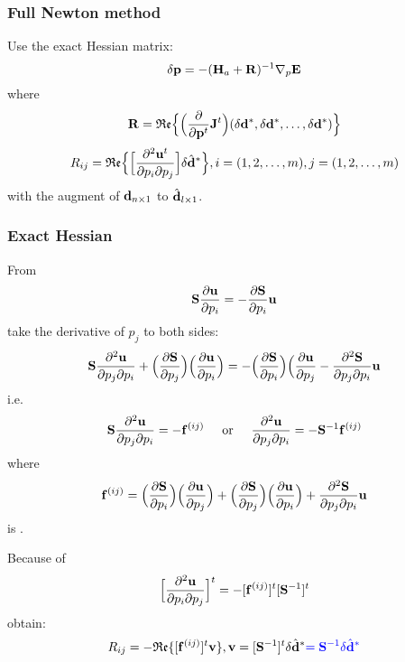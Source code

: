 \subsubsection{Full Newton method}
Use the exact Hessian matrix:
\[ \delta\mathbf{p}=-(\mathbf{H}_a+\mathbf{R})^{-1}\nabla_p\mathbf{E} \]
where
\[ \mathbf{R}=\mathfrak{Re}\Big\{\Big(\frac{\partial}{\partial\mathbf{p}^t}\mathbf{J}^t\Big)(\delta\mathbf{d}^*,\delta\mathbf{d}^*,\ldots,\delta\mathbf{d}^*)\Big\} \]
\[ R_{ij}=\mathfrak{Re}\Big\{\Big[\frac{\partial^2\mathbf{u}^t}{\partial p_i\partial p_j}\Big]\delta\hat{\mathbf{d}}^*\Big\},i=(1,2,\ldots,m),j=(1,2,\ldots,m) \]
with the augment of $\mathbf{d}_{n\times 1}$ to $\hat{\mathbf{d}}_{l\times 1}$.\par
\subsubsection{Exact Hessian}
From
\[ \mathbf{S}\frac{\partial\mathbf{u}}{\partial p_i}=-\frac{\partial\mathbf{S}}{\partial p_i}\mathbf{u} \]
take the derivative of $p_j$ to both sides:
\[ \mathbf{S}\frac{\partial^2\mathbf{u}}{\partial p_j\partial p_i}+\Big(\frac{\partial\mathbf{S}}{\partial p_j}\Big)\Big(\frac{\partial\mathbf{u}}{\partial p_i}\Big)=-\Big(\frac{\partial\mathbf{S}}{\partial p_i}\Big)\Big(\frac{\partial\mathbf{u}}{\partial p_j}-\frac{\partial^2\mathbf{S}}{\partial p_j\partial p_i}\mathbf{u} \]
i.e.
\[ \mathbf{S}\frac{\partial^2\mathbf{u}}{\partial p_j\partial p_i}=-\mathbf{f}^{(ij)} \text{\hspace{5mm}or\hspace{5mm}} \frac{\partial^2\mathbf{u}}{\partial p_j\partial p_i}=-\mathbf{S}^{-1}\mathbf{f}^{(ij)} \]
where
\[ \mathbf{f}^{(ij)}=\Big(\frac{\partial\mathbf{S}}{\partial p_i}\Big)\Big(\frac{\partial\mathbf{u}}{\partial p_j}\Big)+\Big(\frac{\partial\mathbf{S}}{\partial p_j}\Big)\Big(\frac{\partial\mathbf{u}}{\partial p_i}\Big)+\frac{\partial^2\mathbf{S}}{\partial p_j\partial p_i}\mathbf{u} \]
is .\par
Because of
\[ \Big[\frac{\partial^2\mathbf{u}}{\partial p_i\partial p_j}\Big]^t=-[\mathbf{f}^{(ij)}]^t[\mathbf{S}^{-1}]^t \]
obtain:
\[ R_{ij}=-\mathfrak{Re}\{[\mathbf{f}^{(ij)}]^t\mathbf{v}\},\mathbf{v}=[\mathbf{S}^{-1}]^t\delta\hat{\mathbf{d}}^*{\color{blue}=\mathbf{S}^{-1}\delta\hat{\mathbf{d}}^*} \]\par
